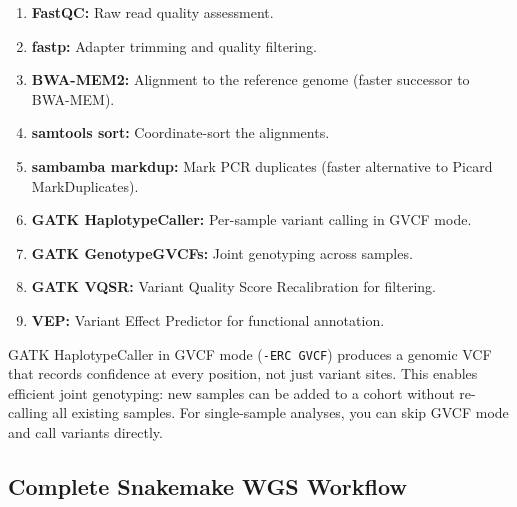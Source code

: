 \begin{enumerate}[itemsep=2pt]
  \item \textbf{FastQC:} Raw read quality assessment.
  \item \textbf{fastp:} Adapter trimming and quality filtering.
  \item \textbf{BWA-MEM2:} Alignment to the reference genome (faster successor to BWA-MEM).
  \item \textbf{samtools sort:} Coordinate-sort the alignments.
  \item \textbf{sambamba markdup:} Mark PCR duplicates (faster alternative to Picard MarkDuplicates).
  \item \textbf{GATK HaplotypeCaller:} Per-sample variant calling in GVCF mode.
  \item \textbf{GATK GenotypeGVCFs:} Joint genotyping across samples.
  \item \textbf{GATK VQSR:} Variant Quality Score Recalibration for filtering.
  \item \textbf{VEP:} Variant Effect Predictor for functional annotation.
\end{enumerate}

\begin{tipbox}[title={Why GVCF Mode?}]
GATK HaplotypeCaller in GVCF mode (\texttt{-ERC GVCF}) produces a genomic VCF that records confidence at every position, not just variant sites. This enables efficient joint genotyping: new samples can be added to a cohort without re-calling all existing samples. For single-sample analyses, you can skip GVCF mode and call variants directly.
\end{tipbox}

\subsection{Complete Snakemake WGS Workflow}


